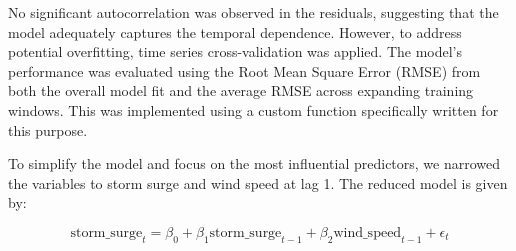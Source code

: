\documentclass[
  letterpaper,
  DIV=11,
  numbers=noendperiod]{scrartcl}
\newenvironment{Shaded}{\begin{snugshade}}{\end{snugshade}}
\newcommand{\AttributeTok}[1]{\textcolor[rgb]{0.40,0.45,0.13}{#1}}
\newcommand{\CommentTok}[1]{\textcolor[rgb]{0.37,0.37,0.37}{#1}}
\newcommand{\DecValTok}[1]{\textcolor[rgb]{0.68,0.00,0.00}{#1}}
\newcommand{\FunctionTok}[1]{\textcolor[rgb]{0.28,0.35,0.67}{#1}}
\newcommand{\NormalTok}[1]{\textcolor[rgb]{0.00,0.23,0.31}{#1}}
\newcommand{\OtherTok}[1]{\textcolor[rgb]{0.00,0.23,0.31}{#1}}
\newcommand{\SpecialCharTok}[1]{\textcolor[rgb]{0.37,0.37,0.37}{#1}}
\newcommand{\StringTok}[1]{\textcolor[rgb]{0.13,0.47,0.30}{#1}}
\begin{document}
No significant autocorrelation was observed in the residuals, suggesting
that the model adequately captures the temporal dependence. However, to
address potential overfitting, time series cross-validation was applied.
The model's performance was evaluated using the Root Mean Square Error
(RMSE) from both the overall model fit and the average RMSE across
expanding training windows. This was implemented using a custom function
specifically written for this purpose.

\begin{Shaded}
\end{Shaded}

To simplify the model and focus on the most influential predictors, we
narrowed the variables to storm surge and wind speed at lag 1. The
reduced model is given by:

\[
\text{storm\_surge}_t=\beta_0+\beta_1\text{storm\_surge}_{t-1}+\beta_2\text{wind\_speed}_{t-1}+\epsilon_t
\]

\begin{Shaded}
\end{Shaded}
\end{document}
